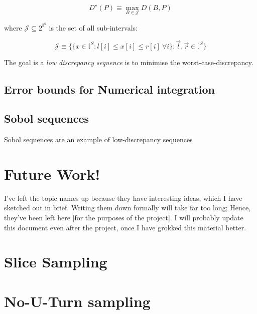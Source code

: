 \documentclass[titlepage]{article}
\newcommand{\I}{\mathbb{I}}
\begin{document}
$$
D^\star(P) \equiv \max_{B \in \mathcal{J}} D(B, P)
$$

where $\mathcal{J} \subseteq 2^{\I^S}$ is the set of all sub-intervals:

$$
\mathcal{J} \equiv \{ \{ x \in \I^S : l[i] \leq x[i] \leq r[i]~\forall i \} : \vec l, \vec r \in \I^S \}
$$

The goal is a \emph{low discrepancy sequence} is to minimise the worst-case-discrepancy.

\subsection{Error bounds for Numerical integration}

\subsection{Sobol sequences}

Sobol sequences are an example of low-discrepancy sequences


\section{Future Work!}
I've left the topic names up because they have interesting ideas, which I have
sketched out in brief. Writing them down formally will take far too long; Hence,
they've been left here [for the purposes of the project]. I will probably update
this document even after the project, once I have grokked this material better.
\section{Slice Sampling}

\section{No-U-Turn sampling}
\end{document}
